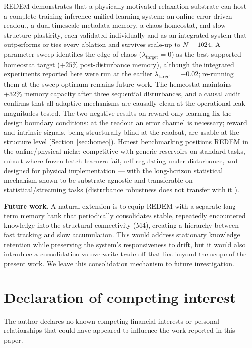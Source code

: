 \documentclass[11pt]{article}
\begin{document}
REDEM demonstrates that a physically motivated relaxation substrate can host a
complete training-inference-unified learning system: an online error-driven
readout, a dual-timescale metadata memory, a chaos homeostat, and slow
structure plasticity, each validated individually and as an integrated system
that outperforms or ties every ablation and survives scale-up to $N=1024$.
A parameter sweep identifies the edge of chaos
($\lambda_{\mathrm{target}}{=}0$) as the best-supported homeostat target
($+25\%$ post-disturbance memory), although the integrated experiments
reported here were run at the earlier $\lambda_{\mathrm{target}}{=}-0.02$;
re-running them at the sweep optimum remains future work. The homeostat
maintains $+32\%$ memory capacity
after three sequential disturbances, and a causal audit confirms that all
adaptive mechanisms are causally clean at the operational leak magnitudes
tested. The two negative
results on reward-only learning fix the design boundary conditions: at the
readout an error channel is necessary; reward and intrinsic signals, being
structurally blind at the readout, are usable at the structure level
(Section~\ref{sec:homeo}). Honest benchmarking positions REDEM in the online/physical
niche: competitive with generic reservoirs on standard tasks, robust where
frozen batch learners fail, self-regulating under disturbance, and designed
for physical implementation --- with the long-horizon statistical mechanism shown to be
substrate-agnostic and transferable on statistical/streaming tasks
(disturbance robustness does not transfer with it \cite{companionC}).

\textbf{Future work.} A natural extension is to equip REDEM with a separate
long-term memory bank that periodically consolidates stable, repeatedly
encountered knowledge into the structural connectivity (M4), creating a
hierarchy between fast tracking and slow accumulation. This would address
stationary knowledge retention while preserving the system's responsiveness
to drift, but it would also introduce a consolidation-vs-overwrite trade-off
that lies beyond the scope of the present work. We leave this consolidation
mechanism to future investigation.

\section*{Declaration of competing interest}

The author declares no known competing financial interests or personal
relationships that could have appeared to influence the work reported in
this paper.
\end{document}
